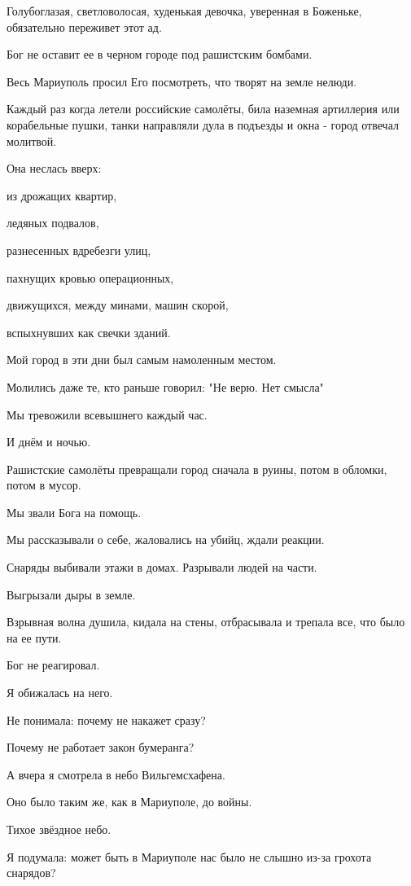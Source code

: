 Голубоглазая,  светловолосая,  худенькая девочка, уверенная в  Боженьке,
обязательно переживет этот ад.  

Бог  не оставит ее в черном городе под рашистским бомбами. 

Весь Мариуполь  просил Его  посмотреть, что творят на земле нелюди. 

Каждый раз когда летели российские самолёты, била наземная артиллерия или
корабельные пушки, танки направляли дула в подъезды и окна - город отвечал
молитвой. 

Она неслась вверх:  

из дрожащих квартир,

ледяных подвалов, 

разнесенных вдребезги улиц, 

пахнущих кровью операционных, 

движущихся,  между минами, машин скорой,

вспыхнувших как свечки зданий. 

Мой город в эти дни был самым намоленным местом. 

Молились даже те, кто раньше  говорил: "Не верю. Нет смысла"

Мы тревожили всевышнего каждый час. 

И днём и ночью.

Рашистские самолёты  превращали город сначала в руины, потом в обломки, потом в
мусор. 

Мы звали Бога на помощь. 

Мы  рассказывали о себе, жаловались на убийц, ждали реакции.

Снаряды выбивали этажи в домах. Разрывали людей на части. 

Выгрызали дыры в земле. 

Взрывная волна душила, кидала на стены, отбрасывала и трепала все, что было на
ее пути. 

Бог не реагировал. 

Я обижалась на него. 

Не понимала: почему не накажет сразу? 

Почему не работает закон бумеранга? 

А вчера я смотрела в небо Вильгемсхафена. 

Оно было таким же, как в Мариуполе,  до войны. 

Тихое звёздное  небо. 

Я подумала: может быть в Мариуполе  нас было не слышно из-за грохота снарядов?
